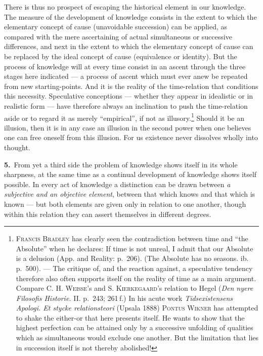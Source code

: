 \documentclass[12pt,a4paper]{book}
\begin{document}
There is thus no prospect of escaping the historical element in our knowledge.
The measure of the development of knowledge consists in the extent to which the
elementary concept of cause (unavoidable succession) can be applied, as compared
with the mere ascertaining of actual simultaneous or successive differences, and
next in the extent to which the elementary concept of cause can be replaced by
the ideal concept of cause (equivalence or identity). But the process of
knowledge will at every time consist in an ascent through the three stages here
indicated --- a process of ascent which must ever anew be repeated from new
starting-points. And it is the reality of the time-relation that conditions this
necessity. Speculative conceptions --- whether they appear in idealistic or in
realistic form --- have therefore always an inclination to push the time-relation
aside or to regard it as merely ``empirical'', if not as
illusory.\footnote{\textsc{Francis Bradley} has clearly seen the contradiction
between time and ``the Absolute'' when he declares: If time is not unreal, I
admit that our Absolute is a delusion (App. and Reality: p.~206). (The Absolute
has no seasons. ib. p.~500). --- The critique of, and the reaction against, a
speculative tendency therefore also often supports itself on the reality of time
as a main argument. Compare \textsc{C. H. Weisse}'s and \textsc{S. Kierkegaard}'s
relation to Hegel (\textit{Den nyere Filosofis Historie.} II. p.~243; 261\,f.) In
his acute work \textit{Tidsexistensens Apologi. Et stycke relationsteori}
(Upsala 1888) \textsc{Pontus Wikner} has attempted to shake the either-or that
here presents itself. He wants to show that the highest perfection can be
attained only by a successive unfolding of qualities which as simultaneous would
exclude one another. But the limitation that lies in succession itself is not
thereby abolished!} Should it be an illusion, then it is in any case an illusion
in the second power when one believes one can free oneself from this illusion.
For us existence never dissolves wholly into thought.

\noindent\textbf{5.}~From yet a third side the problem of knowledge shows itself
in its whole sharpness, at the same time as a continual development of knowledge
shows itself possible. In every act of knowledge a distinction can be drawn
between \emph{a subjective and an objective element}, between that which knows
and that which is known --- but both elements are given only in relation to one
another, though within this relation they can assert themselves in different
degrees.
\end{document}
